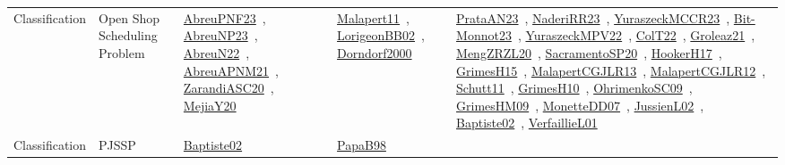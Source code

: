 {\begin{longtable}{lp{3cm}>{\raggedright\arraybackslash}p{6cm}>{\raggedright\arraybackslash}p{6cm}>{\raggedright\arraybackslash}p{8cm}}
Classification & Open Shop Scheduling Problem & \href{../works/AbreuPNF23.pdf}{AbreuPNF23}~\cite{AbreuPNF23}, \href{../works/AbreuNP23.pdf}{AbreuNP23}~\cite{AbreuNP23}, \href{../works/AbreuN22.pdf}{AbreuN22}~\cite{AbreuN22}, \href{../works/AbreuAPNM21.pdf}{AbreuAPNM21}~\cite{AbreuAPNM21}, \href{../works/ZarandiASC20.pdf}{ZarandiASC20}~\cite{ZarandiASC20}, \href{../works/MejiaY20.pdf}{MejiaY20}~\cite{MejiaY20} & \href{../works/Malapert11.pdf}{Malapert11}~\cite{Malapert11}, \href{../works/LorigeonBB02.pdf}{LorigeonBB02}~\cite{LorigeonBB02}, \href{../works/Dorndorf2000.pdf}{Dorndorf2000}~\cite{Dorndorf2000} & \href{../works/PrataAN23.pdf}{PrataAN23}~\cite{PrataAN23}, \href{../works/NaderiRR23.pdf}{NaderiRR23}~\cite{NaderiRR23}, \href{../works/YuraszeckMCCR23.pdf}{YuraszeckMCCR23}~\cite{YuraszeckMCCR23}, \href{../works/Bit-Monnot23.pdf}{Bit-Monnot23}~\cite{Bit-Monnot23}, \href{../works/YuraszeckMPV22.pdf}{YuraszeckMPV22}~\cite{YuraszeckMPV22}, \href{../works/ColT22.pdf}{ColT22}~\cite{ColT22}, \href{../works/Groleaz21.pdf}{Groleaz21}~\cite{Groleaz21}, \href{../works/MengZRZL20.pdf}{MengZRZL20}~\cite{MengZRZL20}, \href{../works/SacramentoSP20.pdf}{SacramentoSP20}~\cite{SacramentoSP20}, \href{../works/HookerH17.pdf}{HookerH17}~\cite{HookerH17}, \href{../works/GrimesH15.pdf}{GrimesH15}~\cite{GrimesH15}, \href{../works/MalapertCGJLR13.pdf}{MalapertCGJLR13}~\cite{MalapertCGJLR13}, \href{../works/MalapertCGJLR12.pdf}{MalapertCGJLR12}~\cite{MalapertCGJLR12}, \href{../works/Schutt11.pdf}{Schutt11}~\cite{Schutt11}, \href{../works/GrimesH10.pdf}{GrimesH10}~\cite{GrimesH10}, \href{../works/OhrimenkoSC09.pdf}{OhrimenkoSC09}~\cite{OhrimenkoSC09}, \href{../works/GrimesHM09.pdf}{GrimesHM09}~\cite{GrimesHM09}, \href{../works/MonetteDD07.pdf}{MonetteDD07}~\cite{MonetteDD07}, \href{../works/JussienL02.pdf}{JussienL02}~\cite{JussienL02}, \href{../works/Baptiste02.pdf}{Baptiste02}~\cite{Baptiste02}, \href{../works/VerfaillieL01.pdf}{VerfaillieL01}~\cite{VerfaillieL01}\\
Classification & PJSSP & \href{../works/Baptiste02.pdf}{Baptiste02}~\cite{Baptiste02} & \href{../works/PapaB98.pdf}{PapaB98}~\cite{PapaB98} & \\

\end{longtable}}
